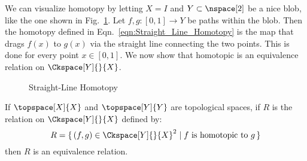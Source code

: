\documentclass{article}                                                        %
\begin{document}
        We can visualize homotopy by letting $X=I$ and $Y\subset\nspace[2]$ be a
        nice blob, like the one shown in Fig.~\ref{fig:straight_line_homotopy}.
        Let $f,g:[0,1]\rightarrow Y$ be paths within the blob. Then the homotopy
        defined in Eqn.~\ref{eqn:Straight_Line_Homotopy} is the map that
        drags $f(x)$ to $g(x)$ via the straight line connecting the two points.
        This is done for every point $x\in [0,1]$.
        We now show that homotopic is an equivalence relation on
        $\Ckspace[Y]{}{X}$.
        \begin{figure}[H]
            \centering
            \captionsetup{type=figure}
            
            \caption{Straight-Line Homotopy}
            \label{fig:straight_line_homotopy}
        \end{figure}
        \begin{theorem}
            If $\topspace[X]{X}$ and $\topspace[Y]{Y}$ are topological spaces,
            if $R$ is the relation on $\Ckspace[Y]{}{X}$ defined by:
            \begin{equation}
                R=\{\,(f,g)\in\Ckspace[Y]{}{X}^{2}\;|\;
                    f\textrm{ is homotopic to }g\,\}
            \end{equation}
            then $R$ is an equivalence relation.
        \end{theorem}
\end{document}
